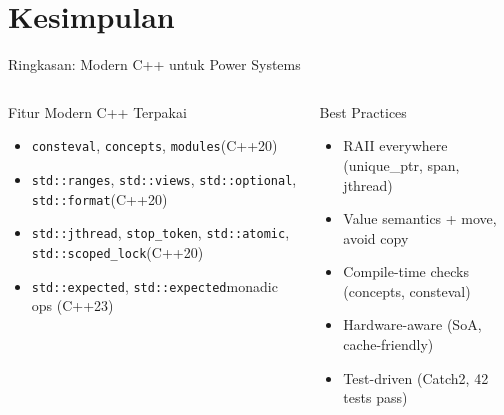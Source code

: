 \documentclass[aspectratio=169,10pt]{beamer}
\newcommand{\consteval}{\texttt{consteval}}
\newcommand{\optional}{\texttt{std::optional}}
\newcommand{\expected}{\texttt{std::expected}}
\newcommand{\jthread}{\texttt{std::jthread}}
\newcommand{\atomic}{\texttt{std::atomic}}
\newcommand{\scopedlock}{\texttt{std::scoped\_lock}}
\newcommand{\ranges}{\texttt{std::ranges}}
\newcommand{\views}{\texttt{std::views}}
\newcommand{\format}{\texttt{std::format}}
\newcommand{\concepts}{\texttt{concepts}}
\newcommand{\modules}{\texttt{modules}}
\newcommand{\stoptoken}{\texttt{stop\_token}}
\begin{document}
\section{Kesimpulan}

\begin{frame}{Ringkasan: Modern C++ untuk Power Systems}
  \begin{columns}[T]
    \begin{block}{Fitur Modern C++ Terpakai}
      \begin{itemize}
        \item \consteval, \concepts, \modules (C++20)
        \item \ranges, \views, \optional, \format (C++20)
        \item \jthread, \stoptoken, \atomic, \scopedlock (C++20)
        \item \expected, \expected monadic ops (C++23)
      \end{itemize}
    \end{block}
    \begin{block}{Best Practices}
      \begin{itemize}
        \item RAII everywhere (unique\_ptr, span, jthread)
        \item Value semantics + move, avoid copy
        \item Compile-time checks (concepts, consteval)
        \item Hardware-aware (SoA, cache-friendly)
        \item Test-driven (Catch2, 42 tests pass)
      \end{itemize}
    \end{block}
  \end{columns}
\end{frame}
\end{document}
